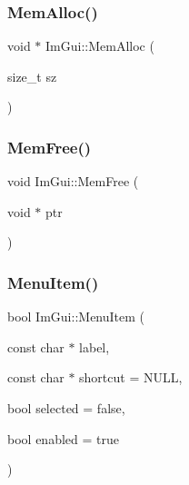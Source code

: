 \mbox{\label{namespace_im_gui_a15efb2cac4a54b35489c5984ba1b661a}} 
\subsubsection{\texorpdfstring{Mem\+Alloc()}{MemAlloc()}}
{\footnotesize\ttfamily void $\ast$ Im\+Gui\+::\+Mem\+Alloc (\begin{DoxyParamCaption}\item[{size\+\_\+t}]{sz }\end{DoxyParamCaption})}

\mbox{\label{namespace_im_gui_a269ec695c6e722ec3da85dae37f0675d}} 
\subsubsection{\texorpdfstring{Mem\+Free()}{MemFree()}}
{\footnotesize\ttfamily void Im\+Gui\+::\+Mem\+Free (\begin{DoxyParamCaption}\item[{void $\ast$}]{ptr }\end{DoxyParamCaption})}

\mbox{\label{namespace_im_gui_aa1bae511ca47478998693a9d8c84f2e6}} 
\subsubsection{\texorpdfstring{Menu\+Item()}{MenuItem()}\hspace{0.1cm}{\footnotesize\ttfamily [1/2]}}
{\footnotesize\ttfamily bool Im\+Gui\+::\+Menu\+Item (\begin{DoxyParamCaption}\item[{const char $\ast$}]{label,  }\item[{const char $\ast$}]{shortcut = {\ttfamily NULL},  }\item[{bool}]{selected = {\ttfamily false},  }\item[{bool}]{enabled = {\ttfamily true} }\end{DoxyParamCaption})}

\mbox{\label{namespace_im_gui_a237e76bff3088f1c2622f4aebae2356e}} 
